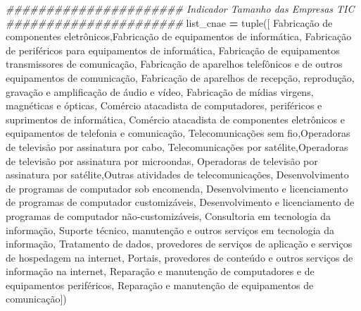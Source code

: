 \documentclass[
  12,
  dvipsnames]{article}
\newenvironment{Shaded}{\begin{snugshade}}{\end{snugshade}}
\newcommand{\BuiltInTok}[1]{#1}
\newcommand{\CommentTok}[1]{\textcolor[rgb]{0.56,0.35,0.01}{\textit{#1}}}
\newcommand{\NormalTok}[1]{#1}
\newcommand{\OperatorTok}[1]{\textcolor[rgb]{0.81,0.36,0.00}{\textbf{#1}}}
\newcommand{\StringTok}[1]{\textcolor[rgb]{0.31,0.60,0.02}{#1}}
\begin{document}
\begin{Shaded}
\begin{Highlighting}[]
\CommentTok{\#\#\#\#\#\#\#\#\#\#\#\#\#\#\#\#\#\#\#\#\#\# Indicador Tamanho das Empresas TIC \#\#\#\#\#\#\#\#\#\#\#\#\#\#\#\#\#\#\#\#\#\#}
\NormalTok{list\_cnae }\OperatorTok{=} \BuiltInTok{tuple}\NormalTok{([}
    \StringTok{\textquotesingle{}Fabricação de componentes eletrônicos\textquotesingle{}}\NormalTok{,}\StringTok{\textquotesingle{}Fabricação de equipamentos de informática\textquotesingle{}}\NormalTok{,}
    \StringTok{\textquotesingle{}Fabricação de periféricos para equipamentos de informática\textquotesingle{}}\NormalTok{,}
    \StringTok{\textquotesingle{}Fabricação de equipamentos transmissores de comunicação\textquotesingle{}}\NormalTok{,}
    \StringTok{\textquotesingle{}Fabricação de aparelhos telefônicos e de outros equipamentos de comunicação\textquotesingle{}}\NormalTok{,}
    \StringTok{\textquotesingle{}Fabricação de aparelhos de recepção, reprodução, gravação e amplificação de áudio e vídeo\textquotesingle{}}\NormalTok{,}
    \StringTok{\textquotesingle{}Fabricação de mídias virgens, magnéticas e ópticas\textquotesingle{}}\NormalTok{,}
    \StringTok{\textquotesingle{}Comércio atacadista de computadores, periféricos e suprimentos de informática\textquotesingle{}}\NormalTok{,}
    \StringTok{\textquotesingle{}Comércio atacadista de componentes eletrônicos e equipamentos de telefonia e comunicação\textquotesingle{}}\NormalTok{,}
    \StringTok{\textquotesingle{}Telecomunicações sem fio\textquotesingle{}}\NormalTok{,}\StringTok{\textquotesingle{}Operadoras de televisão por assinatura por cabo\textquotesingle{}}\NormalTok{,}
    \StringTok{\textquotesingle{}Telecomunicações por satélite\textquotesingle{}}\NormalTok{,}\StringTok{\textquotesingle{}Operadoras de televisão por assinatura por microondas\textquotesingle{}}\NormalTok{,}
    \StringTok{\textquotesingle{}Operadoras de televisão por assinatura por satélite\textquotesingle{}}\NormalTok{,}\StringTok{\textquotesingle{}Outras atividades de telecomunicações\textquotesingle{}}\NormalTok{,}
    \StringTok{\textquotesingle{}Desenvolvimento de programas de computador sob encomenda\textquotesingle{}}\NormalTok{,}
    \StringTok{\textquotesingle{}Desenvolvimento e licenciamento de programas de computador customizáveis\textquotesingle{}}\NormalTok{,}
    \StringTok{\textquotesingle{}Desenvolvimento e licenciamento de programas de computador não{-}customizáveis\textquotesingle{}}\NormalTok{,}
    \StringTok{\textquotesingle{}Consultoria em tecnologia da informação\textquotesingle{}}\NormalTok{,}
    \StringTok{\textquotesingle{}Suporte técnico, manutenção e outros serviços em tecnologia da informação\textquotesingle{}}\NormalTok{,}
    \StringTok{\textquotesingle{}Tratamento de dados, provedores de serviços de aplicação e serviços de hospedagem na internet\textquotesingle{}}\NormalTok{,}
    \StringTok{\textquotesingle{}Portais, provedores de conteúdo e outros serviços de informação na internet\textquotesingle{}}\NormalTok{,}
    \StringTok{\textquotesingle{}Reparação e manutenção de computadores e de equipamentos periféricos\textquotesingle{}}\NormalTok{,}
    \StringTok{\textquotesingle{}Reparação e manutenção de equipamentos de comunicação\textquotesingle{}}\NormalTok{])}


\end{Highlighting}
\end{Shaded}
\end{document}
